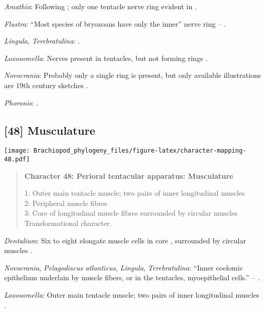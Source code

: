 \documentclass[openany]{book}
\theoremstyle{definition}
\theoremstyle{definition}
\theoremstyle{definition}
\theoremstyle{remark}
\begin{document}
\hypertarget{Amathia-coding-47}{}
\emph{Amathia}: Following \citet{Temereva2017Innervationof}; only one
tentacle nerve ring evident in \citet{Temereva2016Thenervous}.

\hypertarget{Flustra-coding-47}{}
\emph{Flustra}: ``Most species of bryozoans have only the inner'' nerve
ring -- \citet{Temereva2017Innervationof}.

\hypertarget{Lingula-coding-47}{}
\emph{Lingula}, \emph{Terebratulina}: \citet{Temereva2017Innervationof}.

\hypertarget{Loxosomella-coding-47}{}
\emph{Loxosomella}: Nerves present in tentacles, but not forming rings
\citep{Fuchs2006}.

\hypertarget{Novocrania-coding-47}{}
\emph{Novocrania}: Probably only a single ring is present, but only
available illustrations are 19th century sketches \citep{Luter2016}.

\hypertarget{Phoronis-coding-47}{}
\emph{Phoronis}: \citet{Temereva2017Thefirst}.

\subsection*{{[}48{]} Musculature}\label{musculature}

\texttt{[image: Brachiopod\_phylogeny\_files/figure-latex/character-mapping-48.pdf]}

\begin{quote}
\textbf{Character 48: Perioral tentacular apparatus: Musculature}

1: Outer main tentacle muscle; two pairs of inner longitudinal muscles\\
2: Peripheral muscle fibres\\
3: Core of longitudinal muscle fibres surrounded by circular muscles\\
Transformational character.
\end{quote}

\hypertarget{Dentalium-coding-48}{}
\emph{Dentalium}: Six to eight elongate muscle cells in core
\citep{Shimek1988}, surrounded by circular muscles \citep{Byrum1994}.

\hypertarget{Lingula-coding-48}{}
\emph{Novocrania}, \emph{Pelagodiscus atlanticus}, \emph{Lingula},
\emph{Terebratulina}: ``Inner coelomic epithelium underlain by muscle
fibers, or in the tentacles, myoepithelial cells.'' --
\citet{Williams1997Introduction}.

\hypertarget{Loxosomella-coding-48}{}
\emph{Loxosomella}: Outer main tentacle muscle; two pairs of inner
longitudinal muscles \citep{Fuchs2006}.
\end{document}

